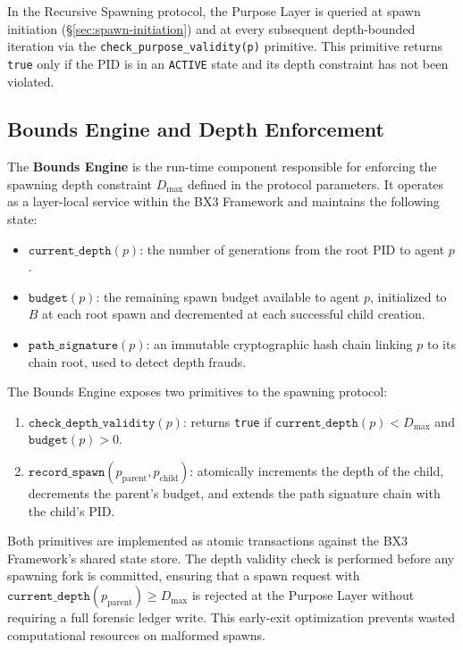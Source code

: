 In the Recursive Spawning protocol, the Purpose Layer is queried at
spawn initiation (\S\ref{sec:spawn-initiation}) and at every subsequent
depth-bounded iteration via the \texttt{check\_purpose\_validity(p)}
primitive. This primitive returns \texttt{true} only if the PID is in
an \texttt{ACTIVE} state and its depth constraint has not been violated.

\subsection{Bounds Engine and Depth Enforcement}
\label{sec:bounds-engine}

The \textbf{Bounds Engine} is the run-time component responsible for
enforcing the spawning depth constraint $D_{\max}$ defined in the
protocol parameters. It operates as a layer-local service within the
BX3 Framework and maintains the following state:

\begin{itemize}
  \item $\texttt{current\_depth}(p)$: the number of generations from
        the root PID to agent $p$.
  \item $\texttt{budget}(p)$: the remaining spawn budget available to
        agent $p$, initialized to $B$ at each root spawn and decremented
        at each successful child creation.
  \item $\texttt{path\_signature}(p)$: an immutable cryptographic hash
        chain linking $p$ to its chain root, used to detect depth frauds.
\end{itemize}

The Bounds Engine exposes two primitives to the spawning protocol:

\begin{enumerate}
  \item $\texttt{check\_depth\_validity}(p)$: returns \texttt{true} if
        $\texttt{current\_depth}(p) < D_{\max}$ and $\texttt{budget}(p) > 0$.
  \item $\texttt{record\_spawn}(p_{\text{parent}}, p_{\text{child}})$:
        atomically increments the depth of the child, decrements the
        parent's budget, and extends the path signature chain with the
        child's PID.
\end{enumerate}

Both primitives are implemented as atomic transactions against the BX3
Framework's shared state store. The depth validity check is performed
before any spawning fork is committed, ensuring that a spawn request
with $\texttt{current\_depth}(p_{\text{parent}}) \geq D_{\max}$ is
rejected at the Purpose Layer without requiring a full forensic ledger
write. This early-exit optimization prevents wasted computational
resources on malformed spawns.

